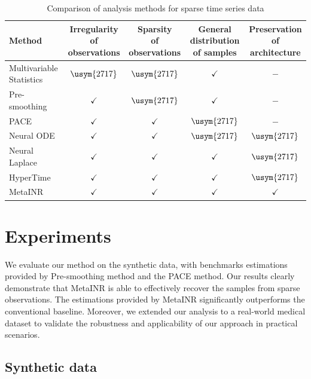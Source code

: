 \documentclass{article}
\newcommand{\xmark}{\usym{2717}}
\begin{document}
\begin{table}[htb]
  \centering
\begin{tabular}{lcccc}
  \hline 
  Method & \thead{Irregularity\\of observations} & \thead{Sparsity \\of observations} & \thead{General distribution \\ of samples} & \thead{Preservation \\ of architecture} \\
  \hline  
  Multivariable Statistics& $\xmark$ & $\xmark$ & $\checkmark$ & $-$\\
  Pre-smoothing & $\checkmark$ & $\xmark$ & $\checkmark$ & $-$\\
  PACE \cite{yao2005functional} & $\checkmark$ & $\checkmark$ & $\xmark$& $-$  \\
  Neural ODE \cite{chen2018neural} & $\checkmark$ & $\checkmark$ & $\xmark$ & $\xmark$ \\
  Neural Laplace \cite{holt2022neural} & $\checkmark$ & $\checkmark$ & $\checkmark$ & $\xmark$ \\
  HyperTime \cite{fons2022hypertime} & $\checkmark$ & $\checkmark$ & $\checkmark$ & $\xmark$ \\
  MetaINR & $\checkmark$ & $\checkmark$ &$\checkmark$ & $\checkmark$\\
 \hline
\end{tabular}
\caption{Comparison of analysis methods for sparse time series data}
\label{method_compare}
\end{table}




\section{Experiments}
We evaluate our method on the synthetic data, with benchmarks estimations provided by Pre-smoothing method and the PACE method.
Our results clearly demonstrate that MetaINR is able to effectively recover the samples from sparse observations. The estimations provided by MetaINR significantly outperforms the conventional baseline. 
Moreover, we extended our analysis to a real-world medical dataset to validate the robustness and applicability of our approach in practical scenarios.
\subsection{Synthetic data}
\end{document}
